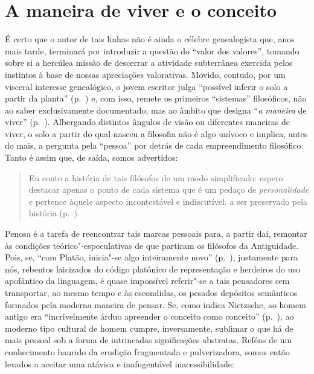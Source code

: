 \section{A maneira de viver e o conceito}

É certo que o autor de tais linhas não é ainda o célebre genealogista que,
anos mais tarde, terminará por introduzir a questão do ``valor dos valores'',
tomando sobre si a hercúlea missão de descerrar a atividade subterrânea
exercida pelos instintos à base de nossas apreciações valorativas. Movido,
contudo, por um visceral interesse genealógico, o jovem escritor julga
``possível inferir o solo a partir da planta'' (p.~\pageref{possivelinferir}) 
e, com isso, remete os primeiros ``sistemas'' filosóficos,
não ao saber exclusivamente documentado, mas ao âmbito que designa ``\textit
{a maneira} de viver'' (p.~\pageref{amaneirade}). Albergando distintos
ângulos de visão ou diferentes maneiras de viver, o solo a partir do qual
nasceu a filosofia não é algo unívoco e implica, antes do mais, a pergunta
pela ``pessoa'' por detrás de cada empreendimento filosófico. Tanto é assim
que, de saída, somos advertidos:

\begin{quote} 
Eu conto a história de tais filósofos de um modo simplificado: 
espero destacar apenas o ponto de cada sistema que é um pedaço
 de \textit{personalidade} e pertence àquele aspecto incontestável 
 e indiscutível, a ser preservado pela história (p.~\pageref{simplificado}).
\end{quote}

Penosa é a tarefa de reencontrar tais marcas pessoais para, a partir daí,
remontar às condições teórico"-especulativas de que partiram os filósofos da
Antiguidade. Pois, se, ``com Platão, inicia"-se algo inteiramente novo''
(p.~\pageref{complatao}), justamente para nós, rebentos laicizados do código
platônico de representação e herdeiros do uso apofântico da linguagem, é
quase impossível referir"-{}se a tais pensadores sem transportar, ao mesmo
tempo e às escondidas, os pesados depósitos semânticos formados pela moderna
maneira de pensar. Se, como indica Nietzsche, ao homem antigo era
``incrivelmente árduo apreender o conceito como conceito'' (p.~\pageref{incrivelmentearduo}), 
ao moderno tipo cultural de homem cumpre,
inversamente, sublimar o que há de mais pessoal sob a forma de intrincadas
significações abstratas. Reféns de um conhecimento haurido da erudição
fragmentada e pulverizadora, somos então levados a aceitar uma atávica e
inafugentável inacessibilidade:

